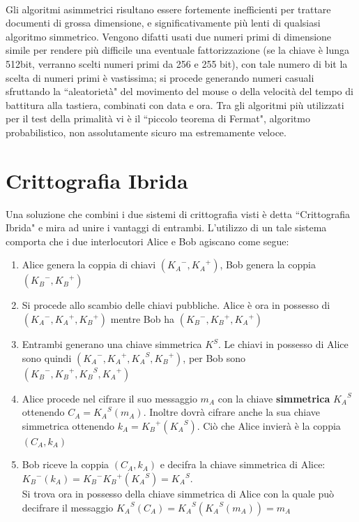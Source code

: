 \documentclass[a4paper,12pt]{tesiinfo}
\begin{document}
\\
Gli algoritmi asimmetrici risultano essere fortemente inefficienti per trattare documenti di grossa dimensione, e significativamente pi\`u lenti di qualsiasi algoritmo simmetrico. Vengono difatti usati due numeri primi di dimensione simile per rendere pi\`u difficile una eventuale fattorizzazione (se la chiave \`e lunga 512bit, verranno scelti numeri primi da 256 e 255 bit), con tale numero di bit la scelta di numeri primi \`e vastissima; si procede generando numeri casuali sfruttando la ``aleatoriet\`a" del movimento del mouse o della velocit\`a del tempo di battitura alla tastiera, combinati con data e ora. Tra gli algoritmi pi\`u utilizzati per il test della primalit\`a vi \`e il ``piccolo teorema di Fermat", algoritmo probabilistico, non assolutamente sicuro ma estremamente veloce. 
\\
\section{Crittografia Ibrida}
Una soluzione che combini i due sistemi di crittografia visti \`e detta ``Crittografia Ibrida" e mira ad unire i vantaggi di entrambi. L'utilizzo di un tale sistema comporta che i due interlocutori Alice e Bob agiscano come segue:
\begin{enumerate}
 \item Alice genera la coppia di chiavi $({K_A}^-, {K_A}^+)$, Bob genera la coppia $({K_B}^-, {K_B}^+)$
 \item Si procede allo scambio delle chiavi pubbliche. Alice \`e ora in possesso di $({K_A}^-, {K_A}^+, {K_B}^+)$ mentre Bob ha $({K_B}^-, {K_B}^+, {K_A}^+)$
 \item Entrambi generano una chiave simmetrica $K^S$. Le chiavi in possesso di Alice sono quindi $({K_A}^-, {K_A}^+, {K_A}^S, {K_B}^+)$, per Bob sono $({K_B}^-, {K_B}^+, {K_B}^S, {K_A}^+)$
 \item Alice procede nel cifrare il suo messaggio $m_A$ con la chiave \textbf{simmetrica} ${K_A}^S$ ottenendo $C_A = {K_A}^S(m_A)$. Inoltre dovr\`a cifrare anche la sua chiave simmetrica ottenendo $k_A={K_B}^+({K_A}^S)$. Ci\`o che Alice invier\`a \`e la coppia $(C_A, k_A)$
 \item Bob riceve la coppia $(C_A, k_A)$ e decifra la chiave simmetrica di Alice:\\ ${K_B}^-(k_A)={K_B}^-{K_B}^+({K_A}^S)={K_A}^S$. \\Si trova ora in possesso della chiave simmetrica di Alice con la quale pu\`o decifrare il messaggio ${K_A}^S(C_A)={K_A}^S({K_A}^S(m_A))=m_A$
\end{enumerate}
%
%
%
\end{document}
